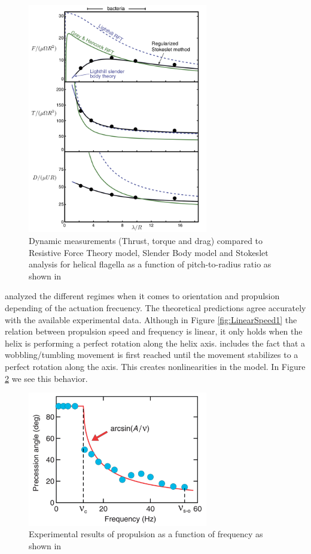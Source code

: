 \begin{figure}[ht]
	\centering
  \includegraphics[width=0.7\textwidth]{Pictures/Rodenborn2013.png}
	\caption{Dynamic measurements (Thrust, torque and drag) compared to Resistive Force Theory model, Slender Body model and Stokeslet analysis for helical flagella as a function of pitch-to-radius ratio as shown in \cite{Rodenborn2013}}
	\label{fig:Rodenborn2013}
\end{figure}

\cite{Morozov2014} analyzed the different regimes when it comes to orientation and propulsion depending of the actuation frecuency. The theoretical predictions agree accurately with the available experimental data. Although in Figure \ref{fig:LinearSpeed1} the relation between propulsion speed and frequency is linear, it only holds when the helix is performing a perfect rotation along the helix axis. \cite{Morozov2014} includes the fact that a wobbling/tumbling movement is first reached until the movement stabilizes to a perfect rotation along the axis. This creates nonlinearities in the model. In Figure \ref{fig:Morozov2014a} we see this behavior. \\

\begin{figure}[ht]
	\centering
  \includegraphics[width=0.7\textwidth]{Pictures/Morozov2014a.png}
	\caption{Experimental results of propulsion as a function of frequency as shown in \cite{Morozov2014}}
	\label{fig:Morozov2014a}
\end{figure}

